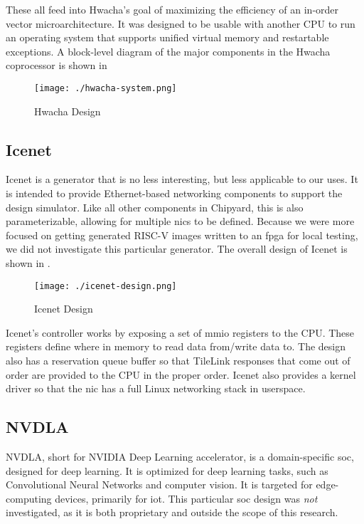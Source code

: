 These all feed into Hwacha's goal of maximizing the efficiency of an in-order vector microarchitecture.
It was designed to be usable with another CPU to run an operating system that supports unified virtual memory and restartable exceptions.
A block-level diagram of the major components in the Hwacha coprocessor is shown in 

\begin{figure}[h!tbp]
  \centering
  \texttt{[image: ./hwacha-system.png]}
  \caption{Hwacha Design~\cite[p.~11]{hwachaPresentation}}
  \label{fig:Hwacha_Accelerator}
\end{figure}

\subsection{Icenet}\label{sec:Icenet_Generator}
\nocite{icenetGithub}
Icenet is a \gls{generator} that is no less interesting, but less applicable to our uses.
It is intended to provide Ethernet-based networking components to support the  design simulator.
Like all other components in Chipyard, this is also parameterizable, allowing for multiple \Glspl{nic} to be defined.
Because we were more focused on getting generated RISC-V images written to an \Gls{fpga} for local testing, we did not investigate this particular generator.
The overall design of Icenet is shown in .

\begin{figure}[h!tbp]
  \centering
  \texttt{[image: ./icenet-design.png]}
  \caption{Icenet Design}
  \label{fig:Icenet_Generator}
\end{figure}

Icenet's controller works by exposing a set of \gls{mmio} registers to the CPU.\@
These registers define where in memory to read data from/write data to.
The design also has a reservation queue buffer so that TileLink responses that come out of order are provided to the CPU in the proper order.
Icenet also provides a kernel driver so that the \gls{nic} has a full Linux networking stack in userspace.

\subsection{NVDLA}\label{sec:NVDLA_Generator}
\nocite{nvdlaPaper}
\nocite{nvdlaNVIDIAPresentation}
NVDLA, short for NVIDIA Deep Learning \Gls{accelerator}, is a domain-specific \gls{soc}, designed for deep learning.
It is optimized for deep learning tasks, such as Convolutional Neural Networks and computer vision.
It is targeted for edge-computing devices, primarily for \Gls{iot}.
This particular \gls{soc} design was \emph{not} investigated, as it is both proprietary and outside the scope of this research.

